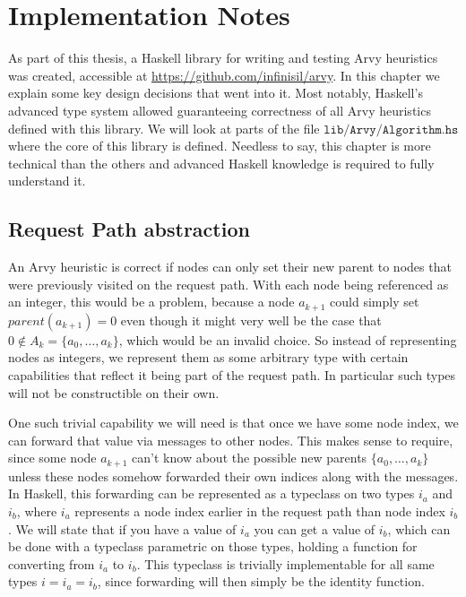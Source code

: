 \documentclass[a4paper, oneside]{discothesis}
\begin{document}



\appendix


\chapter{Implementation Notes}

As part of this thesis, a Haskell library for writing and testing Arvy heuristics was created, accessible at \url{https://github.com/infinisil/arvy}. In this chapter we explain some key design decisions that went into it. Most notably, Haskell's advanced type system allowed guaranteeing correctness of all Arvy heuristics defined with this library. We will look at parts of the file \href{https://github.com/Infinisil/arvy/blob/1bdac2aa8e599372f2b058d26ec9c33fd53d7a72/lib/Arvy/Algorithm.hs}{$\texttt{lib/Arvy/Algorithm.hs}$} where the core of this library is defined. Needless to say, this chapter is more technical than the others and advanced Haskell knowledge is required to fully understand it.

\section{Request Path abstraction}

An Arvy heuristic is correct if nodes can only set their new parent to nodes that were previously visited on the request path. With each node being referenced as an integer, this would be a problem, because a node $a_{k+1}$ could simply set $parent(a_{k+1})=0$ even though it might very well be the case that $0\notin A_k=\{a_{0},\dots,a_{k}\}$, which would be an invalid choice. So instead of representing nodes as integers, we represent them as some arbitrary type with certain capabilities that reflect it being part of the request path. In particular such types will not be constructible on their own.

One such trivial capability we will need is that once we have some node index, we can forward that value via messages to other nodes. This makes sense to require, since some node $a_{k+1}$ can't know about the possible new parents $\{a_{0},\dots,a_{k}\}$ unless these nodes somehow forwarded their own indices along with the messages. In Haskell, this forwarding can be represented as a typeclass on two types $i_a$ and $i_b$, where $i_a$ represents a node index earlier in the request path than node index $i_b$. We will state that if you have a value of $i_a$ you can get a value of $i_b$, which can be done with a typeclass parametric on those types, holding a function for converting from $i_a$ to $i_b$. This typeclass is trivially implementable for all same types $i=i_a=i_b$, since forwarding will then simply be the identity function.
\end{document}

